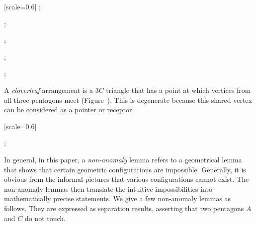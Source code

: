 {
[scale=0.6]
;
\begin{scope}[xshift=4.5cm,yshift=1.5cm]
;
\end{scope}
\begin{scope}[xshift=8cm]
;
\end{scope}
\begin{scope}[xshift=12cm]
;
\end{scope}
\begin{scope}[xshift=16cm]
;
\end{scope}
}





A {\it cloverleaf} arrangement is a $3C$ triangle that has a point at
which vertices from all three pentagons meet
(Figure~).  This is degenerate because this shared
vertex can be considered as a pointer or receptor.

{
[scale=0.6]
\begin{scope}[xshift=4cm]
;
\end{scope}
}


In general, in this paper, a {\it non-anomaly} lemma refers to a
geometrical lemma that shows that certain geometric configurations are
impossible.  Generally, it is obvious from the informal pictures that
various configurations cannot exist.  The non-anomaly lemmas then
translate the intuitive impossibilities into mathematically precise
statements.  We give a few non-anomaly lemmas as follows.
They are expressed as separation results, asserting that
two pentagons $A$ and $C$ do not touch.

